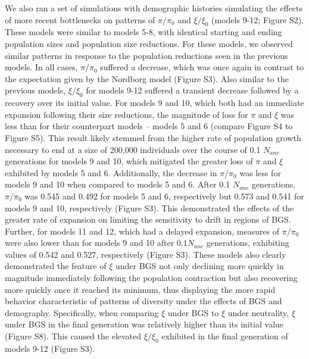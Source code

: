 \documentclass[9pt,twocolumn,twoside]{rilabRxiv}
\begin{document}
We also ran a set of simulations with demographic histories simulating
the effects of more recent bottlenecks on patterns of
$\pi/\pi_0$ and $\xi/\xi_0$ (models 9-12; Figure S2).
These models were similar to models 5-8, with identical starting and
ending population sizes and population size reductions. For these
models, we observed similar patterns in response to the population
reductions seen in the previous models. In all cases,
$\pi/\pi_0$ suffered a decrease, which was once again in
contrast to the expectation given by the Nordborg model (Figure S3).
Also similar to the previous models, $\xi/\xi_0$ for models
9-12 suffered a transient decrease followed by a recovery over its initial value.
For models 9 and 10, which both had an immediate
expansion following their size reductions, the magnitude of loss for $\pi$
and $\xi$ was less than for their counterpart models -- models 5 and 6
(compare Figure S4 to Figure S5). This result likely stemmed from the
higher rate of population growth necessary to end at a size of 200,000
individuals over the course of 0.1 $N_{anc}$
generations for models 9 and 10, which mitigated the greater loss of $\pi$
and $\xi$ exhibited by models 5 and 6. Additionally, the decrease in
$\pi/\pi_0$ was less for models 9 and 10 when compared to
models 5 and 6. After 0.1 $N_{anc}$ generations,
$\pi/\pi_0$ was 0.545 and 0.492 for models 5 and 6,
respectively but 0.573 and 0.541 for models 9 and 10, respectively
(Figure S3). This demonstrated the effects of the greater rate of
expansion on limiting the sensitivity to drift in regions of BGS.
Further, for models 11 and 12, which had a delayed expansion, measures
of $\pi/\pi_0$ were also lower than for models 9 and 10 after
$0.1N_{anc}$ generations, exhibiting values of 0.542
and 0.527, respectively (Figure S3). These models also clearly
demonstrated the feature of $\xi$ under BGS not only declining more quickly
in magnitude immediately following the population contraction but also
recovering more quickly once it reached its minimum, thus displaying the
more rapid behavior characteristic of patterns of diversity under the
effects of BGS and demography. Specifically, when comparing $\xi$ under BGS
to $\xi$ under neutrality, $\xi$ under BGS in the final generation was
relatively higher than its initial value (Figure S8). This caused the
elevated $\xi/\xi_0$ exhibited in the final generation of
models 9-12 (Figure S3).
\end{document}
